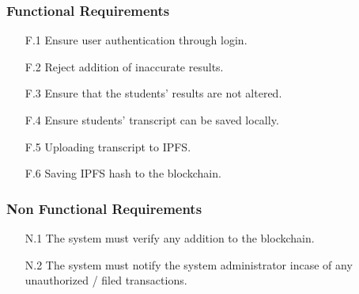 \subsubsection{Functional Requirements}
\begin{enumerate}
\item[F.1] Ensure user authentication through login.
\item[F.2] Reject addition of inaccurate results.
\item[F.3] Ensure that the students’ results are not altered.
\item[F.4] Ensure students' transcript can be saved locally.
\item[F.5] Uploading transcript to IPFS.
\item[F.6] Saving IPFS hash to the blockchain.
\end{enumerate}

\subsubsection{Non Functional Requirements}
\begin{enumerate}
\item[N.1] The system must verify any addition to the blockchain.
\item[N.2] The system must notify the system administrator incase of any unauthorized / filed transactions.
\end{enumerate}

